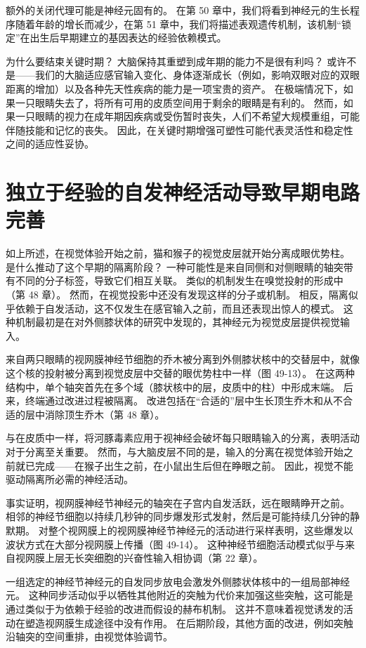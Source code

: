 额外的关闭代理可能是神经元固有的。 在第 50 章中，我们将看到神经元的生长程序随着年龄的增长而减少，在第 51 章中，我们将描述表观遗传机制，该机制“锁定”在出生后早期建立的基因表达的经验依赖模式。

为什么要结束关键时期？ 大脑保持其重塑到成年期的能力不是很有利吗？ 或许不是——我们的大脑适应感官输入变化、身体逐渐成长（例如，影响双眼对应的双眼距离的增加）以及各种先天性疾病的能力是一项宝贵的资产。 在极端情况下，如果一只眼睛失去了，将所有可用的皮质空间用于剩余的眼睛是有利的。 然而，如果一只眼睛的视力在成年期因疾病或受伤暂时丧失，人们不希望大规模重组，可能伴随技能和记忆的丧失。 因此，在关键时期增强可塑性可能代表灵活性和稳定性之间的适应性妥协。

\section{独立于经验的自发神经活动导致早期电路完善}
如上所述，在视觉体验开始之前，猫和猴子的视觉皮层就开始分离成眼优势柱。 是什么推动了这个早期的隔离阶段？ 一种可能性是来自同侧和对侧眼睛的轴突带有不同的分子标签，导致它们相互关联。 类似的机制发生在嗅觉投射的形成中（第 48 章）。 然而，在视觉投影中还没有发现这样的分子或机制。 相反，隔离似乎依赖于自发活动，这不仅发生在感官输入之前，而且还表现出惊人的模式。 这种机制最初是在对外侧膝状体的研究中发现的，其神经元为视觉皮层提供视觉输入。

来自两只眼睛的视网膜神经节细胞的乔木被分离到外侧膝状核中的交替层中，就像这个核的投射被分离到视觉皮层中交替的眼优势柱中一样（图 49-13）。 在这两种结构中，单个轴突首先在多个域（膝状核中的层，皮质中的柱）中形成末端。 后来，终端通过改进过程被隔离。 改进包括在“合适的”层中生长顶生乔木和从不合适的层中消除顶生乔木（第 48 章）。

与在皮质中一样，将河豚毒素应用于视神经会破坏每只眼睛输入的分离，表明活动对于分离至关重要。 然而，与大脑皮层不同的是，输入的分离在视觉体验开始之前就已完成——在猴子出生之前，在小鼠出生后但在睁眼之前。 因此，视觉不能驱动隔离所必需的神经活动。

事实证明，视网膜神经节神经元的轴突在子宫内自发活跃，远在眼睛睁开之前。 相邻的神经节细胞以持续几秒钟的同步爆发形式发射，然后是可能持续几分钟的静默期。 对整个视网膜上的视网膜神经节神经元的活动进行采样表明，这些爆发以波状方式在大部分视网膜上传播（图 49-14）。 这种神经节细胞活动模式似乎与来自视网膜上层无长突细胞的兴奋性输入相协调（第 22 章）。

一组选定的神经节神经元的自发同步放电会激发外侧膝状体核中的一组局部神经元。 这种同步活动似乎以牺牲其他附近的突触为代价来加强这些突触，这可能是通过类似于为依赖于经验的改进而假设的赫布机制。 这并不意味着视觉诱发的活动在塑造视网膜生成途径中没有作用。 在后期阶段，其他方面的改进，例如突触沿轴突的空间重排，由视觉体验调节。

